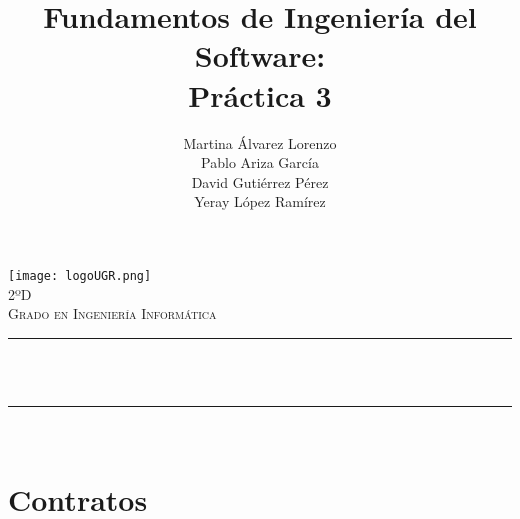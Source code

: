 \documentclass[12pt, spanish]{article}
\title{Fundamentos de Ingeniería del Software:\\
Práctica 3  \hspace{0.05cm} }
\date{}
\author{
\begin{center}
Martina Álvarez Lorenzo  \\
Pablo Ariza García  \\
David Gutiérrez Pérez  \\
Yeray López Ramírez \\
\end{center}
}
\makeatletter
\let\thetitle\@title
\let\theauthor\@author
\makeatother
\begin{document}

\begin{titlepage}
  \centering
  \vspace*{0.5 cm}
  \texttt{[image: logoUGR.png]}\\[1.0 cm]
  \textsc{\large 2ºD}\\[0.5 cm]
  \textsc{\large Grado en Ingeniería Informática}\\[0.5 cm]              
  \rule{\linewidth}{0.2 mm} \\[0.4 cm]
  { \huge \bfseries \thetitle}\\
  \rule{\linewidth}{0.2 mm} \\[1.5 cm]
  
      
  \theauthor

  \vfill
  
\end{titlepage}

\newpage



\tableofcontents
\pagebreak

\section{Contratos}
\end{document}

